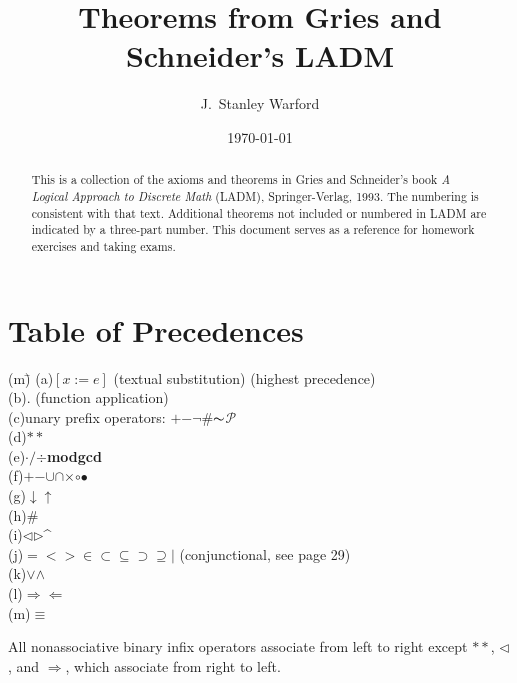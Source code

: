 \documentclass{amsart}
\newcommand{\impl}{\ensuremath{\Rightarrow}}        %
\newcommand{\foll}{\ensuremath{\Leftarrow}}         %
\begin{document}
\title[Theorems from LADM]{Theorems from Gries and Schneider's LADM}
\author{J.~Stanley Warford}
\address{Natural Science Division\\
         Pepperdine University\\
         Malibu, CA 90265}
\date{\today}
\begin{abstract}
This is a collection of the axioms and theorems in Gries and Schneider's
book \textit{A Logical Approach to Discrete Math} (LADM), Springer-Verlag, 1993.
The numbering is consistent with that text.
Additional theorems not included or numbered in LADM are indicated by a three-part
number.
This document serves as a reference for homework exercises and taking exams.
\end{abstract}

\maketitle

\section*{Table of Precedences}
\begin{tabbing}
(m)\;\=\kill
(a)\>$[x := e]$ (textual substitution) \qquad \hfill (highest precedence)\\
(b)\>. (function application)\\
(c)\>unary prefix operators: $+$\quad $-$\quad $\neg$\quad $\#$\quad $\thicksim$\quad $\mathcal{P}$\\
(d)\>$**$\\
(e)\>$\cdot$\quad $/$\quad $\div$\quad \textbf{mod}\quad \textbf{gcd}\\
(f)\>$+$\quad $-$\quad $\cup$\quad $\cap$\quad $\times$\quad $\circ$\quad $\bullet$\\
(g)\>$\downarrow$\quad $\uparrow$\\
(h)\>$\#$\\
(i)\>$\triangleleft$\quad $\triangleright$\quad \textasciicircum\\
(j)\>$=$\quad $<$\quad $>$\quad $\in$\quad $\subset$\quad $\subseteq$\quad $\supset$\quad $\supseteq$\quad $\mid$
\qquad (conjunctional, see page 29)\\
(k)\>$\lor$\quad $\land$\\
(l)\>$\impl$\quad $\foll$\\
(m)\>$\equiv$\\
\end{tabbing}
\par
All nonassociative binary infix operators associate from left to right except $**$, $\triangleleft$, and $\impl$,
which associate from right to left.
\end{document}
